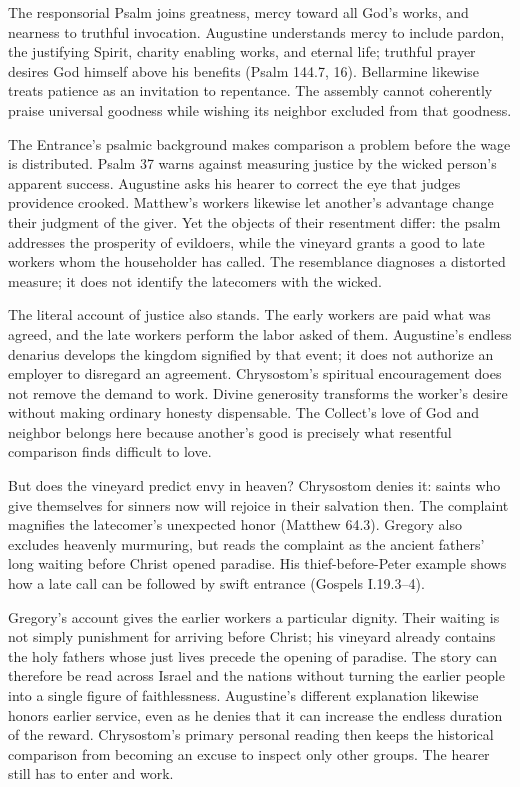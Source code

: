 The responsorial Psalm joins greatness, mercy toward all God's works, and nearness to truthful invocation. Augustine understands mercy to include pardon, the justifying Spirit, charity enabling works, and eternal life; truthful prayer desires God himself above his benefits (Psalm 144.7, 16). Bellarmine likewise treats patience as an invitation to repentance. The assembly cannot coherently praise universal goodness while wishing its neighbor excluded from that goodness.

The Entrance's psalmic background makes comparison a problem before the wage is distributed. Psalm 37 warns against measuring justice by the wicked person's apparent success. Augustine asks his hearer to correct the eye that judges providence crooked. Matthew's workers likewise let another's advantage change their judgment of the giver. Yet the objects of their resentment differ: the psalm addresses the prosperity of evildoers, while the vineyard grants a good to late workers whom the householder has called. The resemblance diagnoses a distorted measure; it does not identify the latecomers with the wicked.

The literal account of justice also stands. The early workers are paid what was agreed, and the late workers perform the labor asked of them. Augustine's endless denarius develops the kingdom signified by that event; it does not authorize an employer to disregard an agreement. Chrysostom's spiritual encouragement does not remove the demand to work. Divine generosity transforms the worker's desire without making ordinary honesty dispensable. The Collect's love of God and neighbor belongs here because another's good is precisely what resentful comparison finds difficult to love.

But does the vineyard predict envy in heaven? Chrysostom denies it: saints who give themselves for sinners now will rejoice in their salvation then. The complaint magnifies the latecomer's unexpected honor (Matthew 64.3). Gregory also excludes heavenly murmuring, but reads the complaint as the ancient fathers' long waiting before Christ opened paradise. His thief-before-Peter example shows how a late call can be followed by swift entrance (Gospels I.19.3--4).

Gregory's account gives the earlier workers a particular dignity. Their waiting is not simply punishment for arriving before Christ; his vineyard already contains the holy fathers whose just lives precede the opening of paradise. The story can therefore be read across Israel and the nations without turning the earlier people into a single figure of faithlessness. Augustine's different explanation likewise honors earlier service, even as he denies that it can increase the endless duration of the reward. Chrysostom's primary personal reading then keeps the historical comparison from becoming an excuse to inspect only other groups. The hearer still has to enter and work.

